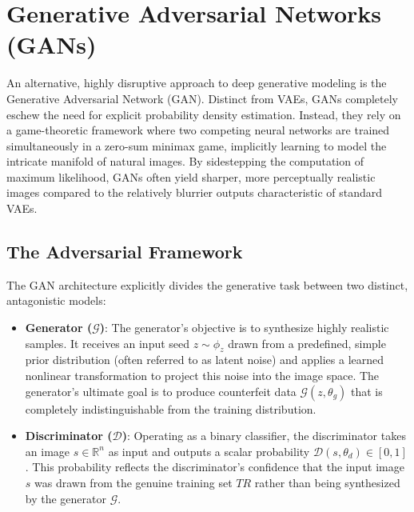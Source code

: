 \section{Generative Adversarial Networks (GANs)}
An alternative, highly disruptive approach to deep generative modeling is the Generative Adversarial Network (GAN). Distinct from VAEs, GANs completely eschew the need for explicit probability density estimation. Instead, they rely on a game-theoretic framework where two competing neural networks are trained simultaneously in a zero-sum minimax game, implicitly learning to model the intricate manifold of natural images. By sidestepping the computation of maximum likelihood, GANs often yield sharper, more perceptually realistic images compared to the relatively blurrier outputs characteristic of standard VAEs.

\subsection{The Adversarial Framework}
The GAN architecture explicitly divides the generative task between two distinct, antagonistic models:
\begin{itemize}
    \item \textbf{Generator ($\mathcal{G}$)}: The generator's objective is to synthesize highly realistic samples. It receives an input seed $z \sim \phi_z$ drawn from a predefined, simple prior distribution (often referred to as latent noise) and applies a learned nonlinear transformation to project this noise into the image space. The generator's ultimate goal is to produce counterfeit data $\mathcal{G}(z, \theta_g)$ that is completely indistinguishable from the training distribution.
    \item \textbf{Discriminator ($\mathcal{D}$)}: Operating as a binary classifier, the discriminator takes an image $s \in \mathbb{R}^n$ as input and outputs a scalar probability $\mathcal{D}(s, \theta_d) \in [0, 1]$. This probability reflects the discriminator's confidence that the input image $s$ was drawn from the genuine training set $TR$ rather than being synthesized by the generator $\mathcal{G}$.
\end{itemize}

